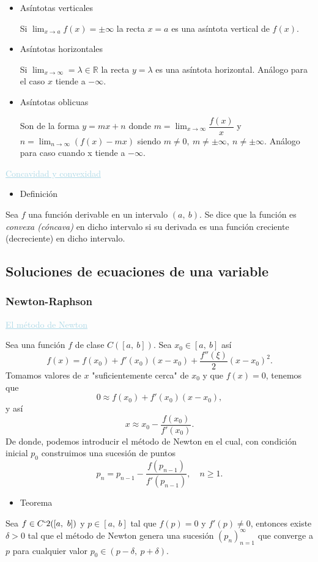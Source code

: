 \begin{itemize}[label=\color{red}\textbullet, leftmargin=*]
	\item {\color{lightblue}Asíntotas verticales}
	
	Si $\lim_{x\to a}f(x)=\pm\infty$ la recta $x=a$ es una asíntota vertical de $f(x)$.
	
	\item {\color{lightblue} Asíntotas horizontales}
	
	Si $\lim_{x\to\infty}=\lambda\in\mathbb{R}$ la recta $y=\lambda$ es una asíntota horizontal. Análogo para el caso $x$ tiende a $-\infty$.
	
	\item {\color{lightblue}Asíntotas oblicuas}
	
	Son de la forma $y=mx+n$ donde $m=\lim_{x\to\infty}\dfrac{f(x)}{x}$ y $n=\lim_{n\to\infty}(f(x)-mx)$ siendo $m\neq0,~m\neq\pm\infty,~n\neq\pm\infty$. Análogo para caso cuando x tiende a $-\infty$.
\end{itemize}
\textcolor{lightblue}{\underline{Concavidad y convexidad}}
\begin{itemize}[label=\color{red}\textbullet, leftmargin=*]
	\item \color{lightblue}Definición
\end{itemize}
Sea $f$ una función derivable en un intervalo $(a,~b)$. Se dice que la función es \textit{convexa (cóncava)} en dicho intervalo si su derivada es una función creciente (decreciente) en dicho intervalo.
\subsection{Soluciones de ecuaciones de una variable}
\subsubsection{Newton-Raphson}
\textcolor{lightblue}{\underline{El método de Newton}}

Sea una función $f$ de clase $C([a,~b])$. Sea $x_0\in[a,~b]$ así \[ f(x)=f(x_0)+f'(x_0)(x-x_0)+\dfrac{f''(\xi)}{2}(x-x_0)^2. \]
Tomamos valores de $x$ "suficientemente cerca" de $x_0$ y que $f(x)=0$, tenemos que \[ 0\approx f(x_0)+f'(x_0)(x-x_0), \]y así \[ x\approx x_0-\dfrac{f(x_0)}{f'(x_0)}. \]
De donde, podemos introducir el método de Newton en el cual, con condición inicial $p_0$ construimos una sucesión de puntos \[ p_n=p_{n-1}-\dfrac{f(p_{n-1})}{f'(p_{n-1})},\quad n\ge1. \]
\begin{itemize}[label=\color{red}\textbullet, leftmargin=*]
	\item \color{lightblue}Teorema
\end{itemize}
Sea $f\in C`2([a,~b])$ y $p\in[a,~b]$ tal que $f(p)=0$ y $f'(p)\neq0$, entonces existe $\delta>0$ tal que el método de Newton genera una sucesión $(p_n)_{n=1}^\infty$ que converge a $p$ para cualquier valor $p_0\in(p-\delta,~p+\delta)$.

